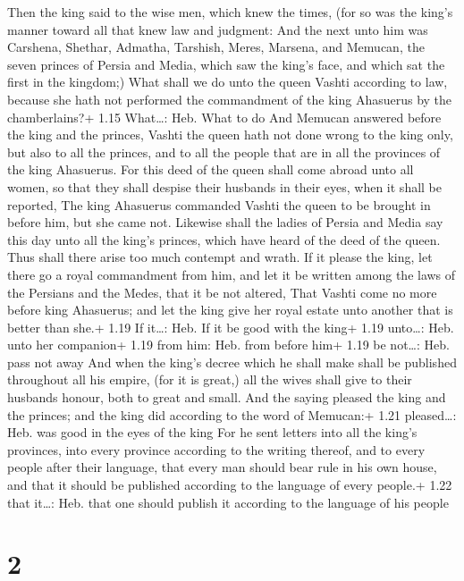  Then the king said to the wise men, which knew the
times, (for so was the king's manner toward all that knew law and
judgment:  And the next unto him was Carshena, Shethar,
Admatha, Tarshish, Meres, Marsena, and Memucan, the seven princes of
Persia and Media, which saw the king's face, and which sat the first in
the kingdom;)  What shall we do unto the queen Vashti
according to law, because she hath not performed the commandment of the
king Ahasuerus by the chamberlains?+ 1.15 What\ldots: Heb. What to do
 And Memucan answered before the king and the princes,
Vashti the queen hath not done wrong to the king only, but also to all
the princes, and to all the people that are in all the provinces of the
king Ahasuerus.  For this deed of the queen shall come
abroad unto all women, so that they shall despise their husbands in
their eyes, when it shall be reported, The king Ahasuerus commanded
Vashti the queen to be brought in before him, but she came not.
 Likewise shall the ladies of Persia and Media say this day
unto all the king's princes, which have heard of the deed of the queen.
Thus shall there arise too much contempt and wrath.  If it
please the king, let there go a royal commandment from him, and let it
be written among the laws of the Persians and the Medes, that it be not
altered, That Vashti come no more before king Ahasuerus; and let the
king give her royal estate unto another that is better than she.+ 1.19
If it\ldots: Heb. If it be good with the king+ 1.19 unto\ldots: Heb.
unto her companion+ 1.19 from him: Heb. from before him+ 1.19 be
not\ldots: Heb. pass not away  And when the king's decree
which he shall make shall be published throughout all his empire, (for
it is great,) all the wives shall give to their husbands honour, both to
great and small.  And the saying pleased the king and the
princes; and the king did according to the word of Memucan:+ 1.21
pleased\ldots: Heb. was good in the eyes of the king  For
he sent letters into all the king's provinces, into every province
according to the writing thereof, and to every people after their
language, that every man should bear rule in his own house, and that it
should be published according to the language of every people.+ 1.22
that it\ldots: Heb. that one should publish it according to the language
of his people

\hypertarget{section-1}{%
\section{2}\label{section-1}}

